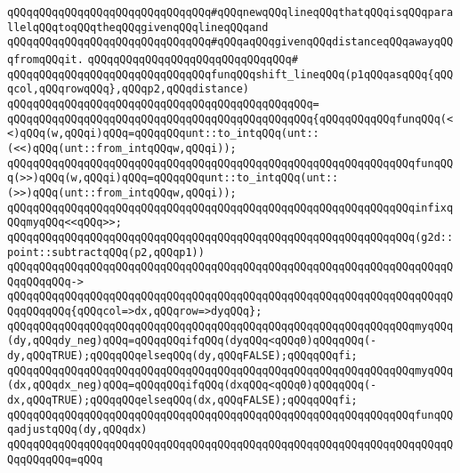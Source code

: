 \verb|qQQqqQQqqQQqqQQqqQQqqQQqqQQqqQQq#qQQqnewqQQqlineqQQqthatqQQqisqQQqparallelqQQqtoqQQqtheqQQqgivenqQQqlineqQQqand|\newline
\verb|qQQqqQQqqQQqqQQqqQQqqQQqqQQqqQQq#qQQqaqQQqgivenqQQqdistanceqQQqawayqQQqfromqQQqit.|\newline
\verb|qQQqqQQqqQQqqQQqqQQqqQQqqQQqqQQq#|\newline
\verb|qQQqqQQqqQQqqQQqqQQqqQQqqQQqqQQqfunqQQqshift_lineqQQq(p1qQQqasqQQq{qQQqcol,qQQqrowqQQq},qQQqp2,qQQqdistance)|\newline
\verb|qQQqqQQqqQQqqQQqqQQqqQQqqQQqqQQqqQQqqQQqqQQqqQQq=|\newline
\verb|qQQqqQQqqQQqqQQqqQQqqQQqqQQqqQQqqQQqqQQqqQQqqQQq{qQQqqQQqqQQqfunqQQq(<<)qQQq(w,qQQqi)qQQq=qQQqqQQqunt::to_intqQQq(unt::(<<)qQQq(unt::from_intqQQqw,qQQqi));|\newline
\verb|qQQqqQQqqQQqqQQqqQQqqQQqqQQqqQQqqQQqqQQqqQQqqQQqqQQqqQQqqQQqqQQqfunqQQq(>>)qQQq(w,qQQqi)qQQq=qQQqqQQqunt::to_intqQQq(unt::(>>)qQQq(unt::from_intqQQqw,qQQqi));|\newline
\newline
\verb|qQQqqQQqqQQqqQQqqQQqqQQqqQQqqQQqqQQqqQQqqQQqqQQqqQQqqQQqqQQqqQQqinfixqQQqmyqQQq<<qQQq>>;|\newline
\newline
\verb|qQQqqQQqqQQqqQQqqQQqqQQqqQQqqQQqqQQqqQQqqQQqqQQqqQQqqQQqqQQqqQQq(g2d::point::subtractqQQq(p2,qQQqp1))|\newline
\verb|qQQqqQQqqQQqqQQqqQQqqQQqqQQqqQQqqQQqqQQqqQQqqQQqqQQqqQQqqQQqqQQqqQQqqQQqqQQqqQQq->|\newline
\verb|qQQqqQQqqQQqqQQqqQQqqQQqqQQqqQQqqQQqqQQqqQQqqQQqqQQqqQQqqQQqqQQqqQQqqQQqqQQqqQQq{qQQqcol=>dx,qQQqrow=>dyqQQq};|\newline
\newline
\verb|qQQqqQQqqQQqqQQqqQQqqQQqqQQqqQQqqQQqqQQqqQQqqQQqqQQqqQQqqQQqqQQqmyqQQq(dy,qQQqdy_neg)qQQq=qQQqqQQqifqQQq(dyqQQq<qQQq0)qQQqqQQq(-dy,qQQqTRUE);qQQqqQQqelseqQQq(dy,qQQqFALSE);qQQqqQQqfi;|\newline
\verb|qQQqqQQqqQQqqQQqqQQqqQQqqQQqqQQqqQQqqQQqqQQqqQQqqQQqqQQqqQQqqQQqmyqQQq(dx,qQQqdx_neg)qQQq=qQQqqQQqifqQQq(dxqQQq<qQQq0)qQQqqQQq(-dx,qQQqTRUE);qQQqqQQqelseqQQq(dx,qQQqFALSE);qQQqqQQqfi;|\newline
\newline
\verb|qQQqqQQqqQQqqQQqqQQqqQQqqQQqqQQqqQQqqQQqqQQqqQQqqQQqqQQqqQQqqQQqfunqQQqadjustqQQq(dy,qQQqdx)|\newline
\verb|qQQqqQQqqQQqqQQqqQQqqQQqqQQqqQQqqQQqqQQqqQQqqQQqqQQqqQQqqQQqqQQqqQQqqQQqqQQqqQQq=qQQq|\newline
